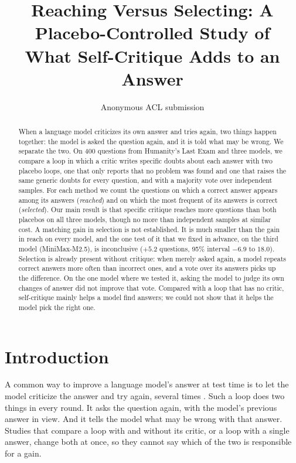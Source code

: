 \documentclass[11pt]{article}
\title{Reaching Versus Selecting: A Placebo-Controlled Study of\\What Self-Critique Adds to an Answer}
\author{Anonymous ACL submission}
\begin{document}
\maketitle

\begin{abstract}
When a language model criticizes its own answer and tries again, two things happen together: the model is asked the question again, and it is told what may be wrong.
We separate the two.
On 400 questions from Humanity's Last Exam and three models, we compare a loop in which a critic writes specific doubts about each answer with two placebo loops, one that only reports that no problem was found and one that raises the same generic doubts for every question, and with a majority vote over independent samples.
For each method we count the questions on which a correct answer appears among its answers (\emph{reached}) and on which the most frequent of its answers is correct (\emph{selected}).
Our main result is that specific critique reaches more questions than both placebos on all three models, though no more than independent samples at similar cost.
A matching gain in selection is not established.
It is much smaller than the gain in reach on every model, and the one test of it that we fixed in advance, on the third model (MiniMax-M2.5), is inconclusive ($+5.2$ questions, 95\% interval $-6.9$ to $18.0$).
Selection is already present without critique: when merely asked again, a model repeats correct answers more often than incorrect ones, and a vote over its answers picks up the difference.
On the one model where we tested it, asking the model to judge its own changes of answer did not improve that vote.
Compared with a loop that has no critic, self-critique mainly helps a model find answers; we could not show that it helps the model pick the right one.
\end{abstract}

\section{Introduction}

A common way to improve a language model's answer at test time is to let the model criticize the answer and try again, several times \citep{madaan2023selfrefine,shinn2023reflexion}.
Such a loop does two things in every round.
It asks the question again, with the model's previous answer in view.
And it tells the model what may be wrong with that answer.
Studies that compare a loop with and without its critic, or a loop with a single answer, change both at once, so they cannot say which of the two is responsible for a gain.
\end{document}
